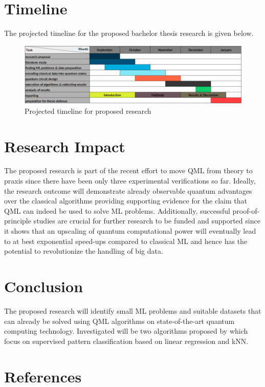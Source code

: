 \documentclass[a4paper]{article}
\newcommand*{\0}{$\ket{0}$}
\newcommand*{\1}{$\ket{1}$}
\begin{document}
\section{Timeline}
\label{sec:timeline}

The projected timeline for the proposed bachelor thesis research is given below.

\begin{figure}[!ht]
\centering
\includegraphics[scale=0.385]{ready_timeline.png}
\caption{Projected timeline for proposed research}
\end{figure}

\section{Research Impact}
\label{sec:research impact}
The proposed research is part of the recent effort to move QML from theory to praxis since there have been only three experimental verifications so far. Ideally, the research outcome will demonstrate already observable quantum advantages over the classical algorithms providing supporting evidence for the claim that QML can indeed be used to solve ML problems. Additionally, successful proof-of-principle studies are crucial for further research to be funded and supported since it shows that an upscaling of quantum computational power will eventually lead to at best exponential speed-ups compared to classical ML and hence has the potential to revolutionize the handling of big data.

\section{Conclusion}
\label{sec:conclusion}
The proposed research will identify small ML problems and suitable datasets that can already be solved using QML algorithms on state-of-the-art quantum computing technology. Investigated will be two algorithms proposed by \cite{Schuld2014, Schuld2016} which focus on supervised pattern classification based on linear regression and kNN. 
\newpage
\section{References}
\begingroup
\renewcommand{\section}[2]{}%


\endgroup


\end{document}
